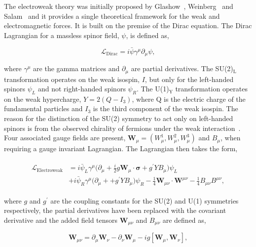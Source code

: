 The electroweak theory was initially proposed by Glashow~\cite{Glashow:1961tr}, Weinberg~\cite{Weinberg:1967tq} and Salam~\cite{Salam:1968rm} and it provides a single theoretical framework for the weak and electromagnetic forces.
It is built on the premise of the Dirac equation.
The Dirac Lagrangian for a massless spinor field, $\psi$, is defined as,

\begin{equation}
\mathcal{L}_{\text{Dirac}} = i\bar{\psi}\gamma^{\mu} \partial_{\mu} \psi,
\end{equation}

where $\gamma^{\mu}$ are the gamma matrices and $\partial_{\mu}$ are partial derivatives.
The SU(2)$_{\text{L}}$ transformation operates on the weak isospin, $I$, but only for the left-handed spinors $\psi_L$ and not right-handed spinors $\psi_R$.
The U(1)$_{\text{Y}}$ transformation operates on the weak hypercharge, $Y=2(Q-I_{3})$, where Q is the electric charge of the fundamental particles and $I_3$ is the third component of the weak isospin.
The reason for the distinction of the SU(2) symmetry to act only on left-handed spinors is from the observed chirality of fermions under the weak interaction~\cite{Lee:1956qn}.
Four associated gauge fields are present, $\boldsymbol{W}_{\mu} = (W^{1}_{\mu}, W^{2}_{\mu}, W^{3}_{\mu})$ and $B_{\mu}$, when requiring a gauge invariant Lagrangian.
The Lagrangian then takes the form,

\begin{align}
\begin{split}
\mathcal{L}_{\text{Electroweak}} &= i\bar{\psi}_{L}\gamma^{\mu}\Big(\partial_{\mu} + \frac{i}{2} g \boldsymbol{W}_{\mu} \cdot \boldsymbol{\sigma} + g^{\prime} Y B_{\mu}  \Big) \psi_L \\
&+ i\bar{\psi}_{R}\gamma^{\mu}\Big(\partial_{\mu} + + g^{\prime} Y B_{\mu}  \Big) \psi_R - \frac{1}{4} \boldsymbol{W}_{\mu\nu} \cdot \boldsymbol{W}^{\mu\nu} - \frac{1}{4}B_{\mu\nu}B^{\mu\nu},
\end{split}
\end{align}

where $g$ and $g^{\prime}$ are the coupling constants for the SU(2) and U(1) symmetries respectively, the partial derivatives have been replaced with the covariant derivative and the added field tensors $\boldsymbol{W}_{\mu\nu}$ and $B_{\mu\nu}$ are defined as,

\begin{equation}
\boldsymbol{W}_{\mu\nu} = \partial_{\mu} \boldsymbol{W}_{\nu} - \partial_{\nu} \boldsymbol{W}_{\mu} - ig[\boldsymbol{W}_{\mu},\boldsymbol{W}_{\nu}],
\end{equation}

